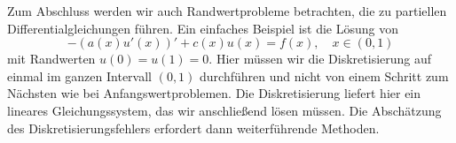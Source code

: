 Zum Abschluss werden wir auch Randwertprobleme betrachten, die zu partiellen Differentialgleichungen führen. Ein einfaches Beispiel ist die Lösung von
$$ - (a(x) u'(x))' + c(x) u(x) = f(x),  \quad x \in (0,1) $$
mit Randwerten $u(0)=u(1)=0$. 
Hier müssen wir die Diskretisierung auf einmal im ganzen Intervall $(0,1)$ durchführen und nicht von einem Schritt zum Nächsten wie bei Anfangswertproblemen. 
Die Diskretisierung liefert hier ein lineares Gleichungssystem, das wir anschlie{\ss}end lösen müssen. 
Die Abschätzung des Diskretisierungsfehlers erfordert dann weiterführende Methoden. 
